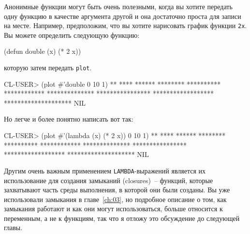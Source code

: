 Анонимные функции могут быть очень полезными, когда вы хотите передать одну функцию в
качестве аргумента другой и она достаточно проста для записи на месте.  Например,
предположим, что вы хотите нарисовать график функции \lstinline{2x}. Вы можете определить
следующую функцию:

\begin{myverb}
(defun double (x) (* 2 x))
\end{myverb}

\noindent{}которую затем передать \lstinline{plot}.

\begin{myverb}
CL-USER> (plot #'double 0 10 1)
**
****
******
********
**********
************
**************
****************
******************
********************
NIL
\end{myverb}

Но легче и более понятно написать вот так:

\begin{myverb}
CL-USER> (plot #'(lambda (x) (* 2 x)) 0 10 1)
**
****
******
********
**********
************
**************
****************
******************
********************
NIL
\end{myverb}

Другим очень важным применением \lstinline{LAMBDA}-выражений является их использование для
создания замыканий (closures)~-- функций, которые захватывают часть среды выполнения, в
которой они были созданы.  Вы уже использовали замыкания в главе~\ref{ch:03}, но подробное
описание о том, как замыкания работают и как они могут использоваться, больше относится к
переменным, а не к функциям, так что я отложу это обсуждение до следующей главы.

